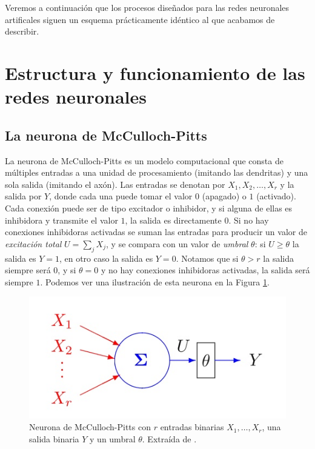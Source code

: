 \documentclass[
  a4paper,
  12pt,
  spanish,
]{scrartcl}
\theoremstyle{teorema-style}
\begin{document}
Veremos a continuación que los procesos diseñados para las redes neuronales artificales siguen un esquema prácticamente idéntico al que acabamos de describir.

\section{Estructura y funcionamiento de las redes neuronales}

\subsection{La neurona de McCulloch-Pitts}

La neurona de McCulloch-Pitts \parencite{mcculloch_logical_1943} es un modelo computacional que consta de múltiples entradas a una unidad de procesamiento (imitando las dendritas) y una sola salida (imitando el axón). Las entradas se denotan por $X_1,X_2,\dots, X_r$ y la salida por $Y$, donde cada una puede tomar el valor $0$ (apagado) o $1$ (activado). Cada conexión puede ser de tipo excitador o inhibidor, y si alguna de ellas es inhibidora y transmite el valor $1$, la salida es directamente $0$. Si no hay conexiones inhibidoras activadas se suman las entradas para producir un valor de \textit{excitación total} $U = \sum_{j} X_j$, y se compara con un valor de \textit{umbral} $\theta$: si $U \ge \theta$ la salida es $Y=1$, en otro caso la salida es $Y=0$. Notamos que si $\theta > r$ la salida siempre será $0$, y si $\theta = 0$ y no hay conexiones inhibidoras activadas, la salida será siempre $1$. Podemos ver una ilustración de esta neurona en la Figura \ref{fig:mcculloch-pitts}.

\begin{figure}[h]
  \centering
  \includegraphics[width=.7\textwidth]{img/mcculloch-pitts}
  \caption{Neurona de McCulloch-Pitts con $r$ entradas binarias $X_1,\dots,X_r$, una salida binaria $Y$ y un umbral $\theta$. Extraída de \parencite{izenman_modern_2008}.}
  \label{fig:mcculloch-pitts}
\end{figure}
\end{document}

